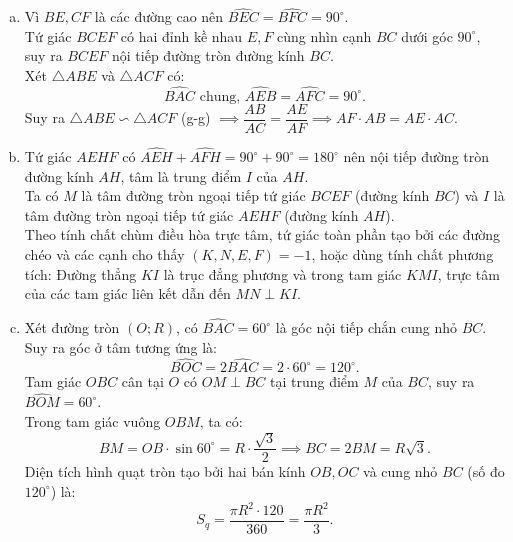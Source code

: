 \begin{bt}
{\begin{center}
\begin{tikzpicture}[scale=0.95]
\end{tikzpicture}
\end{center}
\begin{enumerate}[a)]
    \item Vì $BE, CF$ là các đường cao nên $\widehat{BEC} = \widehat{BFC} = 90^\circ$.\\
    Tứ giác $BCEF$ có hai đỉnh kề nhau $E, F$ cùng nhìn cạnh $BC$ dưới góc $90^\circ$, suy ra $BCEF$ nội tiếp đường tròn đường kính $BC$.\\
    Xét $\triangle ABE$ và $\triangle ACF$ có:
    $$\widehat{BAC}\text{ chung, } \widehat{AEB} = \widehat{AFC} = 90^\circ.$$
    Suy ra $\triangle ABE \backsim \triangle ACF$ (g-g) $\implies \dfrac{AB}{AC} = \dfrac{AE}{AF} \implies AF \cdot AB = AE \cdot AC$.
    \item Tứ giác $AEHF$ có $\widehat{AEH} + \widehat{AFH} = 90^\circ + 90^\circ = 180^\circ$ nên nội tiếp đường tròn đường kính $AH$, tâm là trung điểm $I$ của $AH$.\\
    Ta có $M$ là tâm đường tròn ngoại tiếp tứ giác $BCEF$ (đường kính $BC$) và $I$ là tâm đường tròn ngoại tiếp tứ giác $AEHF$ (đường kính $AH$).\\
    Theo tính chất chùm điều hòa trực tâm, tứ giác toàn phần tạo bởi các đường chéo và các cạnh cho thấy $(K, N, E, F) = -1$, hoặc dùng tính chất phương tích:
    Đường thẳng $KI$ là trục đẳng phương và trong tam giác $KM I$, trực tâm của các tam giác liên kết dẫn đến $MN \perp KI$.
    \item Xét đường tròn $(O; R)$, có $\widehat{BAC} = 60^\circ$ là góc nội tiếp chắn cung nhỏ $BC$.\\
    Suy ra góc ở tâm tương ứng là:
    $$\widehat{BOC} = 2\widehat{BAC} = 2 \cdot 60^\circ = 120^\circ.$$
    Tam giác $OBC$ cân tại $O$ có $OM \perp BC$ tại trung điểm $M$ của $BC$, suy ra $\widehat{BOM} = 60^\circ$.\\
    Trong tam giác vuông $OBM$, ta có:
    $$BM = OB \cdot \sin 60^\circ = R \cdot \dfrac{\sqrt{3}}{2} \implies BC = 2BM = R\sqrt{3}.$$
    Diện tích hình quạt tròn tạo bởi hai bán kính $OB, OC$ và cung nhỏ $BC$ (số đo $120^\circ$) là:
    $$S_q = \dfrac{\pi R^2 \cdot 120}{360} = \dfrac{\pi R^2}{3}.$$
\end{enumerate}
}
\end{bt}

